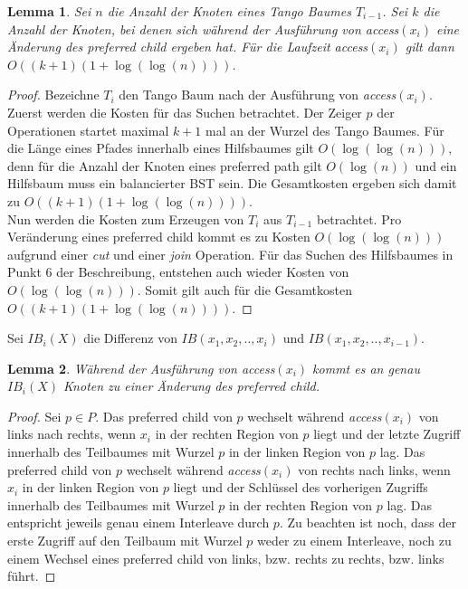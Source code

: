 \documentclass[a4paper,12pt]{article}
\newtheorem{Lemma}{Lemma}[section]
\begin{document}
 
\begin{Lemma} \label{demaineLemma4}
	Sei $n$ die Anzahl der Knoten eines Tango Baumes $T_{i-1}$. Sei $k$ die Anzahl der Knoten, bei denen sich während der Ausführung von \textit{access}$\left(x_i\right)$ eine Änderung des preferred child ergeben hat. Für die Laufzeit \textit{access}$\left(x_i\right)$ gilt dann $O\left(\left(k + 1\right) \left(1 + \log \left( \log  \left(n \right)\right)\right)\right)$.
\end{Lemma}
\begin{proof}
	Bezeichne $T_i$ den Tango Baum nach der Ausführung von \textit{access}$\left(x_i\right)$. Zuerst werden die Kosten für das Suchen betrachtet. Der Zeiger $p$ der Operationen startet maximal $k + 1$ mal an der Wurzel des Tango Baumes. Für die Länge eines Pfades innerhalb eines Hilfsbaumes gilt $O\left(\log \left( \log  \left(n \right)\right)\right)$, denn für die Anzahl der Knoten eines preferred path gilt $O\left( \log \left(n\right)  \right)$ und ein Hilfsbaum muss ein balancierter BST sein. Die Gesamtkosten ergeben sich damit zu $O\left(\left(k + 1\right) \left(1 + \log \left( \log  \left(n \right)\right)\right)\right)$.\\
	Nun werden die Kosten zum Erzeugen von $T_i$ aus $T_{i-1}$ betrachtet. Pro Veränderung eines preferred child kommt es zu Kosten $O\left( \log\left(\log \left(n\right)\right)\right)$ aufgrund einer \textit{cut} und einer \textit{join} Operation. Für das Suchen des Hilfsbaumes in Punkt $6$ der Beschreibung, entstehen auch wieder Kosten von $O\left(\log \left( \log  \left(n \right)\right)\right)$. Somit gilt auch für die Gesamtkosten $O\left(\left(k + 1\right) \left(1 + \log \left( \log  \left(n \right)\right)\right)\right)$.
	
	
\end{proof}
\noindent Sei $\mathit{IB}_i\left(X\right)$ die Differenz von $\mathit{IB}\left(x_1, x_2,..,x_i\right)$ und  $\mathit{IB}\left(x_1, x_2,..,x_{i-1}\right)$. 

\begin{Lemma} \label{demaineLemma5}
	Während der Ausführung von \textit{access}$\left(x_i\right)$ kommt es an genau $\mathit{IB}_i\left(X\right)$ Knoten zu einer Änderung des preferred child.
\end{Lemma}
\begin{proof}
	Sei $p \in P$. Das preferred child von $p$ wechselt während  \textit{access}$\left(x_i\right)$ von links nach rechts,  wenn $x_i$ in der rechten Region von $p$ liegt und der letzte Zugriff innerhalb des Teilbaumes mit Wurzel $p$ in der linken Region von $p$ lag.  Das preferred child von $p$ wechselt während  \textit{access}$\left(x_i\right)$ von rechts nach links,  wenn $x_i$ in der linken Region von $p$ liegt und der Schlüssel des vorherigen Zugriffs innerhalb des Teilbaumes mit Wurzel $p$ in der rechten Region von $p$ lag. Das entspricht jeweils genau einem Interleave durch $p$. Zu beachten ist noch, dass der erste Zugriff auf den Teilbaum mit Wurzel $p$ weder zu einem Interleave, noch zu einem Wechsel eines preferred child von links, bzw. rechts zu rechts, bzw. links führt. 	
\end{proof}
\end{document}
